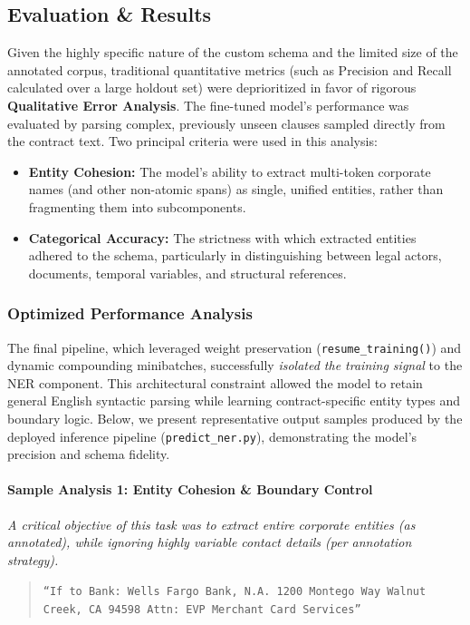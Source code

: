 \documentclass[twoside,final]{hcmut-report}
\begin{document}
\subsection{Evaluation \& Results}
Given the highly specific nature of the custom schema and the limited size of the annotated corpus, traditional quantitative metrics (such as Precision and Recall calculated over a large holdout set) were deprioritized in favor of rigorous \textbf{Qualitative Error Analysis}. The fine-tuned model's performance was evaluated by parsing complex, previously unseen clauses sampled directly from the contract text. Two principal criteria were used in this analysis:
\begin{itemize}
  \item \textbf{Entity Cohesion:} The model's ability to extract multi-token corporate names (and other non-atomic spans) as single, unified entities, rather than fragmenting them into subcomponents.
  \item \textbf{Categorical Accuracy:} The strictness with which extracted entities adhered to the schema, particularly in distinguishing between legal actors, documents, temporal variables, and structural references.
\end{itemize}

\subsubsection*{Optimized Performance Analysis}
The final pipeline, which leveraged weight preservation (\texttt{resume\_training()}) and dynamic compounding minibatches, successfully \textit{isolated the training signal} to the NER component. This architectural constraint allowed the model to retain general English syntactic parsing while learning contract-specific entity types and boundary logic. Below, we present representative output samples produced by the deployed inference pipeline (\texttt{predict\_ner.py}), demonstrating the model's precision and schema fidelity.

\paragraph{Sample Analysis 1: Entity Cohesion \& Boundary Control}
\textit{A critical objective of this task was to extract entire corporate entities (as annotated), while ignoring highly variable contact details (per annotation strategy).}

\begin{quote}
  \texttt{``If to Bank: Wells Fargo Bank, N.A. 1200 Montego Way Walnut Creek, CA 94598 Attn: EVP Merchant Card Services''}
\end{quote}
\end{document}
